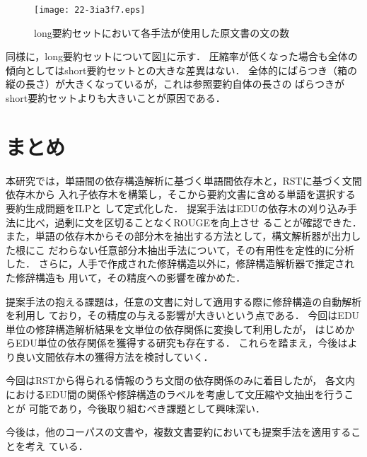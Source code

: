 \documentclass[japanese]{jnlp_1.4}
\begin{document}
\begin{figure}[b]
\begin{center}
\texttt{[image: 22-3ia3f7.eps]}
\end{center}
\caption{long要約セットにおいて各手法が使用した原文書の文の数}
\label{fig:boxes_long}
\end{figure}

同様に，long要約セットについて図\ref{fig:boxes_long}に示す．
圧縮率が低くなった場合も全体の傾向としてはshort要約セットとの大きな差異はない．
全体的にばらつき（箱の縦の長さ）が大きくなっているが，これは参照要約自体の長さの
ばらつきがshort要約セットよりも大きいことが原因である．


\section{まとめ}

本研究では，単語間の依存構造解析に基づく単語間依存木と，RSTに基づく文間依存木から
入れ子依存木を構築し，そこから要約文書に含める単語を選択する要約生成問題をILPと
して定式化した．
提案手法はEDUの依存木の刈り込み手法に比べ，過剰に文を区切ることなくROUGEを向上させ
ることが確認できた．
また，単語の依存木からその部分木を抽出する方法として，構文解析器が出力した根にこ
だわらない任意部分木抽出手法について，その有用性を定性的に分析した．
さらに，人手で作成された修辞構造以外に，修辞構造解析器で推定された修辞構造も
用いて，その精度への影響を確かめた．

提案手法の抱える課題は，任意の文書に対して適用する際に修辞構造の自動解析を利用し
ており，その精度の与える影響が大きいという点である．
今回はEDU単位の修辞構造解析結果を文単位の依存関係に変換して利用したが，
はじめからEDU単位の依存関係を獲得する研究\cite{yoshida14}も存在する．
これらを踏まえ，今後はより良い文間依存木の獲得方法を検討していく．



今回はRSTから得られる情報のうち文間の依存関係のみに着目したが，
各文内におけるEDU間の関係や修辞構造のラベルを考慮して文圧縮や文抽出を行うことが
可能であり，今後取り組むべき課題として興味深い．



今後は，他のコーパスの文書や，複数文書要約においても提案手法を適用することを考え
ている．
\end{document}
